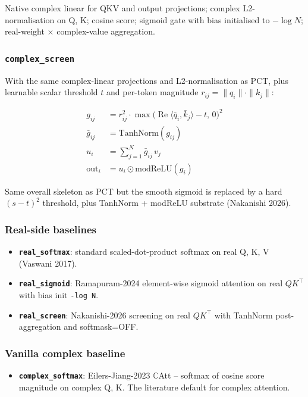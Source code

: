 \documentclass[11pt,a4paper]{article}
\theoremstyle{plain}
\theoremstyle{definition}
\renewcommand{\Re}{\operatorname{Re}}
\begin{document}
Native complex linear for QKV and output projections; complex L2-normalisation on Q, K; cosine score; sigmoid gate with bias initialised to $-\log N$; real-weight $\times$ complex-value aggregation.

\subsubsection{\texttt{complex\_screen}}
With the same complex-linear projections and L2-normalisation as PCT, plus learnable scalar threshold $t$ and per-token magnitude $r_{ij} = \|q_i\| \cdot \|k_j\|$:

\begin{align*}
g_{ij} &= r_{ij}^2 \cdot \max\bigl(\Re\langle \bar{q}_i, \bar{k}_j \rangle - t,\, 0\bigr)^2 \\
\bar{g}_{ij} &= \mathrm{TanhNorm}(g_{ij}) \\
u_i &= \sum_{j=1}^{N} \bar{g}_{ij} \, v_j \\
\mathrm{out}_i &= u_i \odot \mathrm{modReLU}(g_i)
\end{align*}

Same overall skeleton as PCT but the smooth sigmoid is replaced by a hard $(s - t)^2$ threshold, plus TanhNorm + modReLU substrate (Nakanishi 2026).

\subsubsection{Real-side baselines}
\begin{itemize}
  \item \textbf{\texttt{real\_softmax}}: standard scaled-dot-product softmax on real Q, K, V (Vaswani 2017).
  \item \textbf{\texttt{real\_sigmoid}}: Ramapuram-2024 element-wise sigmoid attention on real $Q K^\top$ with bias init \texttt{-log N}.
  \item \textbf{\texttt{real\_screen}}: Nakanishi-2026 screening on real $Q K^\top$ with TanhNorm post-aggregation and softmask=OFF.
\end{itemize}

\subsubsection{Vanilla complex baseline}
\begin{itemize}
  \item \textbf{\texttt{complex\_softmax}}: Eilers-Jiang-2023 $\mathbb{C}$Att -- softmax of cosine score magnitude on complex Q, K. The literature default for complex attention.
\end{itemize}
\end{document}
